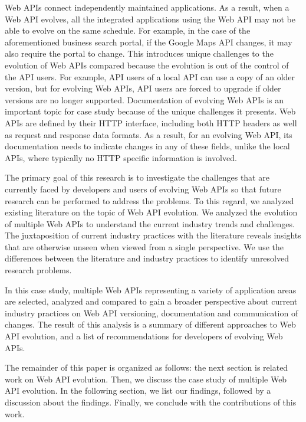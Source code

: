 Web APIs connect independently maintained applications. As a result, when a Web API evolves, all the integrated applications using the Web API may not be able to evolve on the same schedule. For example, in the case of the aforementioned business search portal, if the Google Maps API changes, it may also require the portal to change. This introduces unique challenges to the evolution of Web APIs compared because the evolution is out of the control of the API users. For example, API users of a local API can use a copy of an older version, but for evolving Web APIs, API users are forced to upgrade if older versions are no longer supported. Documentation of evolving Web APIs is an important topic for case study because of the unique challenges it presents. Web APIs are defined by their HTTP interface, including both HTTP headers as well as request and response data formats. As a result, for an evolving Web API, its documentation needs to indicate changes in any of these fields, unlike the local APIs, where typically no HTTP specific information is involved.

The primary goal of this research is to investigate the challenges that are currently faced by developers and users of evolving Web APIs so that future research can be performed to address the problems. To this regard, we analyzed existing literature on the topic of Web API evolution. We analyzed the evolution of multiple Web APIs to understand the current industry trends and challenges. The juxtaposition of current industry practices with the literature reveals insights that are otherwise unseen when viewed from a single perspective. We use the differences between the literature and industry practices to identify unresolved research problems.

In this case study, multiple Web APIs representing a variety of application areas are selected, analyzed and compared to gain a broader perspective about current industry practices on Web API versioning, documentation and communication of changes. The result of this analysis is a summary of different approaches to Web API evolution, and a list of recommendations for developers of evolving Web APIs.

The remainder of this paper is organized as follows: the next section is related work on Web API evolution. Then, we discuss the case study of multiple Web API evolution. In the following section, we list our findings, followed by a discussion about the findings. Finally, we conclude with the contributions of this work.

